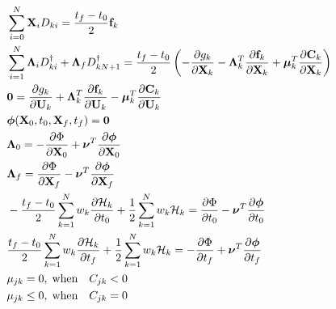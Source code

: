 \documentclass[10pt,final]{report}
\begin{document}
\begin{eqnarray} \label{dis_ness_state}
& \displaystyle\sum_{i=0}^N
\textbf{X}_i D_{ki} = \frac{t_f-t_0}{2}  \textbf{f}_k
 & \vspace{6pt}\\  &
\displaystyle\sum_{i=1}^N \boldsymbol{\Lambda}_i D^\dag_{ki} +
\boldsymbol{\Lambda}_f  D^\dag_{kN+1} =
\displaystyle\frac{t_f-t_0}{2} \left(
 -\frac{\partial g_k}{\partial \textbf{X}_k}
- \boldsymbol{\Lambda}^T_k  \frac{\partial
\textbf{f}_k}{\partial \textbf{X}_k} + \boldsymbol{\mu}_k^T
\frac{\partial \textbf{C}_k}{\partial \textbf{X}_k} \right)  & \vspace{6pt}\\
\label{hbvp discrete 2}
& \textbf{0} = \displaystyle\frac{\partial g_k}{\partial \textbf{U}_k}
+ \boldsymbol{\Lambda}^T_k  \frac{\partial
\textbf{f}_k}{\partial \textbf{U}_k} - \boldsymbol{\mu}_k^T
\frac{\partial \textbf{C}_k}{\partial \textbf{U}_k}   & \vspace{6pt}\\
\label{hbvp discrete 3}
& \boldsymbol{\phi}(\textbf{X}_0,t_0,\textbf{X}_f,t_f) = \textbf{0} \\
& \boldsymbol{\Lambda}_0 = -\displaystyle\frac{\partial
\Phi}{\partial \textbf{X}_0} + \boldsymbol{\nu}^T
\displaystyle\frac{\partial \boldsymbol{\phi}}{\partial
  \textbf{X}_0} & \vspace{6pt} \\
\label{hbvp discrete 4}
& \boldsymbol{\Lambda}_f = \displaystyle\frac{\partial
\Phi}{\partial \textbf{X}_f} - \boldsymbol{\nu}^T
\displaystyle\frac{\partial \boldsymbol{\phi}}{\partial
\textbf{X}_f} &\vspace{6pt}\\ \label{initial_H} & -
\displaystyle\frac{t_f-t_0}{2} \sum_{k = 1}^N w_k
\frac{\partial {\cal H}_k}{\partial t_0}  +
\frac{1}{2} \sum_{k=1}^N w_k  {\cal H}_k =
\displaystyle\frac{\partial \Phi}{\partial t_0} -
\boldsymbol{\nu}^T \frac{\partial
\boldsymbol{\phi}}{\partial t_0}  &\vspace{6pt} \\
\label{final_H} & \displaystyle\frac{t_f-t_0}{2} \sum_{k = 1}^N
w_k  \frac{\partial {\cal H}_k}{\partial t_f}  + \frac{1}{2}
\sum_{k=1}^N w_k  {\cal H}_k =
-\displaystyle\frac{\partial \Phi}{\partial t_f} +
\boldsymbol{\nu}^T \frac{\partial \boldsymbol{\phi}}{\partial
t_f}  & \vspace{6pt}\\
& \mu_{jk}=0 ,  \; \mbox{when} \quad C_{jk} < 0  &\vspace{6pt}\\\label{hbvp discrete 6}
& \mu_{jk}\leq0 , \; \mbox{when} \quad  C_{jk}=0  &\label{hbvp discrete 7}
\end{eqnarray}
\end{document}
